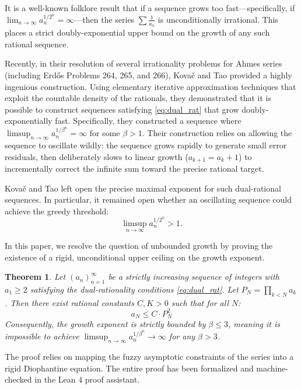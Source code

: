 \documentclass[11pt,reqno]{amsart}
\newtheorem{theorem}{Theorem}[section]
\theoremstyle{definition}
\begin{document}
It is a well-known folklore result that if a sequence grows too fast---specifically, if $\lim_{n \to \infty} a_n^{1/2^n} = \infty$---then the series $\sum \frac{1}{a_n}$ is unconditionally irrational. This places a strict doubly-exponential upper bound on the growth of any such rational sequence. 

Recently, in their resolution of several irrationality problems for Ahmes series (including Erd\H{o}s Problems 264, 265, and 266), Kova\v{c} and Tao \cite{KT25} provided a highly ingenious construction. Using elementary iterative approximation techniques that exploit the countable density of the rationals, they demonstrated that it is possible to construct sequences satisfying \eqref{eq:dual_rat} that grow doubly-exponentially fast. Specifically, they constructed a sequence where $\limsup_{n \to \infty} a_n^{1/\beta^n} = \infty$ for some $\beta > 1$. Their construction relies on allowing the sequence to oscillate wildly: the sequence grows rapidly to generate small error residuals, then deliberately slows to linear growth ($a_{k+1} = a_k + 1$) to incrementally correct the infinite sum toward the precise rational target.

Kova\v{c} and Tao left open the precise maximal exponent for such dual-rational sequences. In particular, it remained open whether an oscillating sequence could achieve the greedy threshold:
\begin{equation}\label{eq:open_q}
\limsup_{n \to \infty} a_n^{1/2^n} > 1.
\end{equation}

In this paper, we resolve the question of unbounded growth by proving the existence of a rigid, unconditional upper ceiling on the growth exponent.

\begin{theorem}\label{thm:main}
Let $(a_n)_{n=1}^\infty$ be a strictly increasing sequence of integers with $a_1 \ge 2$ satisfying the dual-rationality conditions \eqref{eq:dual_rat}. Let $P_N = \prod_{k < N} a_k$. Then there exist rational constants $C, K > 0$ such that for all $N$:
\[ a_N \le C \cdot P_N^2 \]
Consequently, the growth exponent is strictly bounded by $\beta \le 3$, meaning it is impossible to achieve $\limsup_{n \to \infty} a_n^{1/\beta^n} \to \infty$ for any $\beta > 3$.
\end{theorem}

The proof relies on mapping the fuzzy asymptotic constraints of the series into a rigid Diophantine equation. The entire proof has been formalized and machine-checked in the Lean 4 proof assistant.
\end{document}
